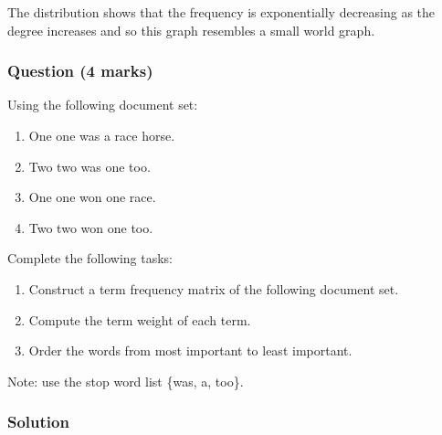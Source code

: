 \documentclass{uws_learning_guide}
\begin{document}
The distribution shows that the frequency is exponentially decreasing
as the degree increases and so this graph resembles a small world
graph.


\subsubsection*{Question (4 marks)}

Using the following document set:
\begin{enumerate}
\item One one was a race horse.
\item Two two was one too.
\item One one won one race.
\item Two two won one too.
\end{enumerate}
Complete the following tasks:
\begin{enumerate}
\item Construct a term frequency matrix of the following document set.
\item Compute the term weight of each term.
\item Order the words from most important to least important.
\end{enumerate}
Note: use the stop word list \{was, a, too\}.

\subsubsection*{Solution}
\end{document}
